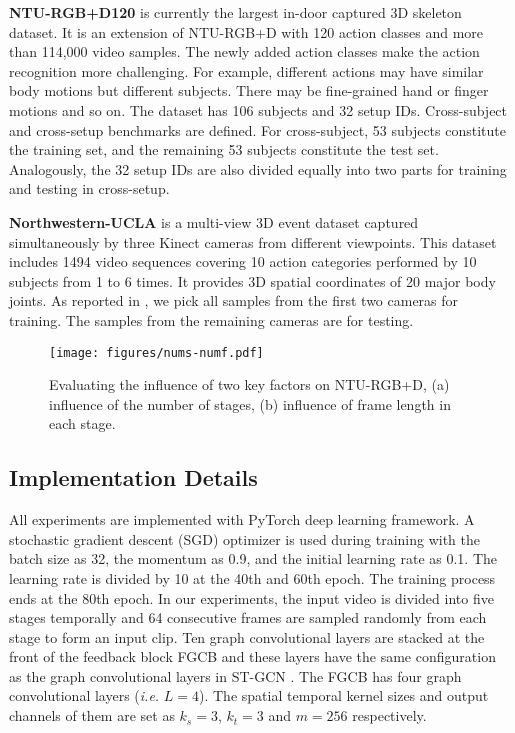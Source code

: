 \documentclass[runningheads]{llncs}
\begin{document}
\textbf{NTU-RGB+D120} \cite{liu2019ntu} is currently the largest in-door captured 3D skeleton dataset. It is an extension of NTU-RGB+D with 120 action classes and more than 114,000 video samples. The newly added action classes make the action recognition more challenging. For example, different actions may have similar body motions but different subjects. There may be fine-grained hand or finger motions and so on. The dataset has 106 subjects and 32 setup IDs. Cross-subject and cross-setup benchmarks are defined. For cross-subject, 53 subjects constitute the training set, and the remaining 53 subjects constitute the test set. Analogously, the 32 setup IDs are also divided equally into two parts for training and testing in cross-setup.



\textbf{Northwestern-UCLA} \cite{wang2014cross} is a multi-view 3D event dataset captured simultaneously by three Kinect cameras from different viewpoints. This dataset includes 1494 video sequences covering 10 action categories performed by 10 subjects from 1 to 6 times. It provides 3D spatial coordinates of 20 major body joints. As reported in \cite{wang2014cross}, we pick all samples from the first two cameras for training. The samples from the remaining cameras are for testing.

\begin{figure}[t]
	\centering
	\texttt{[image: figures/nums-numf.pdf]}
	\caption{Evaluating the influence of two key factors on NTU-RGB+D, (a) influence of the number of stages, (b) influence of frame length in each stage.}
	\vspace{-4mm}
	\label{fig-numf-nums}
\end{figure}

\vspace{-1mm}
\subsection{Implementation Details}

All experiments are implemented with PyTorch deep learning framework. A stochastic gradient descent (SGD) optimizer is used during training with the batch size as 32, the momentum as 0.9, and the initial learning rate as 0.1. The learning rate is divided by 10 at the 40th and 60th epoch. The training process ends at the 80th epoch. In our experiments, the input video is divided into five stages temporally and 64 consecutive frames are sampled randomly from each stage to form an input clip.
Ten graph convolutional layers are stacked at the front of the feedback block FGCB and these layers have the same configuration as the graph convolutional layers in ST-GCN \cite{yan2018spatial}. The FGCB has four graph convolutional layers (\textit{i.e.} $L=4$). The spatial temporal kernel sizes and output channels of them are set as $k_s=3$, $k_t=3$ and $m=256$ respectively.
\end{document}

